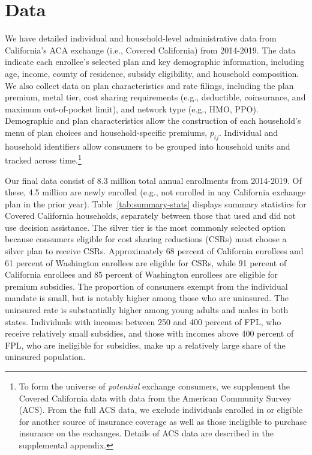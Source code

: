 \documentclass[12pt]{article}
\begin{document}
\section{Data}
\label{sec:data}
We have detailed individual and household-level administrative data from California's ACA exchange (i.e., Covered California) from 2014-2019. The data indicate each enrollee's selected plan and key demographic information, including age, income, county of residence, subsidy eligibility, and household composition. We also collect data on plan characteristics and rate filings, including the plan premium, metal tier, cost sharing requirements (e.g., deductible, coinsurance, and maximum out-of-pocket limit), and network type (e.g., HMO, PPO). Demographic and plan characteristics allow the construction of each household's menu of plan choices and household-specific premiums, $p_{ij}$. Individual and household identifiers allow consumers to be grouped into household units and tracked across time.\footnote{To form the universe of \textit{potential} exchange consumers, we supplement the Covered California data with data from the American Community Survey (ACS). From the full ACS data, we exclude individuals enrolled in or eligible for another source of insurance coverage as well as those ineligible to purchase insurance on the exchanges. Details of ACS data are described in the supplemental appendix.} 

Our final data consist of 8.3 million total annual enrollments from 2014-2019. Of these, 4.5 million are newly enrolled (e.g., not enrolled in any California exchange plan in the prior year). Table~\ref{tab:summary-stats} displays summary statistics for Covered California households, separately between those that used and did not use decision assistance. The silver tier is the most commonly selected option because consumers eligible for cost sharing reductions (CSRs) must choose a silver plan to receive CSRs.  Approximately 68 percent of California enrollees and 61 percent of Washington enrollees are eligible for CSRs, while 91 percent of California enrollees and 85 percent of Washington enrollees are eligible for premium subsidies.  The proportion of consumers exempt from the individual mandate is small, but is notably higher among those who are uninsured.  The uninsured rate is substantially higher among young adults and males in both states. Individuals with incomes between 250 and 400 percent of FPL, who receive relatively small subsidies, and those with incomes above 400 percent of FPL, who are ineligible for subsidies, make up a relatively large share of the uninsured population.
\end{document}
